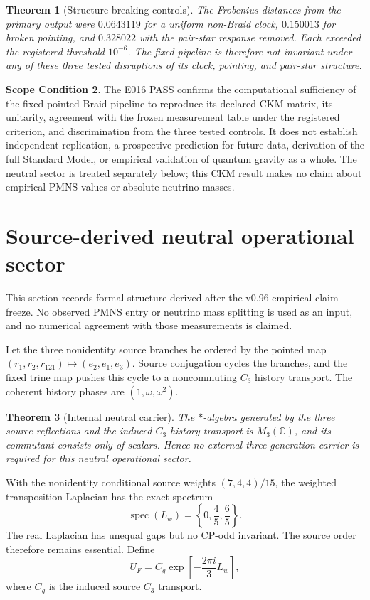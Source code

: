 \documentclass[11pt]{article}
\newtheorem{theorem}{Theorem}[section]
\theoremstyle{definition}
\newtheorem{scope}[theorem]{Scope Condition}
\theoremstyle{remark}
\begin{document}
\begin{theorem}[Structure-breaking controls]
The Frobenius distances from the primary output were $0.0643119$ for a uniform non-Braid clock, $0.150013$ for broken pointing, and $0.328022$ with the pair-star response removed. Each exceeded the registered threshold $10^{-6}$. The fixed pipeline is therefore not invariant under any of these three tested disruptions of its clock, pointing, and pair-star structure.
\end{theorem}

\begin{scope}
The E016 PASS confirms the computational sufficiency of the fixed pointed-Braid pipeline to reproduce its declared CKM matrix, its unitarity, agreement with the frozen measurement table under the registered criterion, and discrimination from the three tested controls. It does not establish independent replication, a prospective prediction for future data, derivation of the full Standard Model, or empirical validation of quantum gravity as a whole. The neutral sector is treated separately below; this CKM result makes no claim about empirical PMNS values or absolute neutrino masses.
\end{scope}

\section{Source-derived neutral operational sector}

This section records formal structure derived after the v0.96 empirical claim
freeze. No observed PMNS entry or neutrino mass splitting is used as an input,
and no numerical agreement with those measurements is claimed.

Let the three nonidentity source branches be ordered by the pointed map
$(r_1,r_2,r_{121})\mapsto(e_2,e_1,e_3)$. Source conjugation cycles the branches,
and the fixed trine map pushes this cycle to a noncommuting $C_3$ history
transport. The coherent history phases are $(1,\omega,\omega^2)$.

\begin{theorem}[Internal neutral carrier]
The $*$-algebra generated by the three source reflections and the induced
$C_3$ history transport is $M_3(\mathbb C)$, and its commutant consists only
of scalars. Hence no external three-generation carrier is required for this
neutral operational sector.
\end{theorem}

With the nonidentity conditional source weights
$(7,4,4)/15$, the weighted transposition Laplacian has the exact spectrum
\begin{equation}
\operatorname{spec}(L_w)=\left\{0,\frac45,\frac65\right\}.
\label{eq:neutral-laplacian}
\end{equation}
The real Laplacian has unequal gaps but no CP-odd invariant. The source order
therefore remains essential. Define
\begin{equation}
U_F=C_g\exp\!\left[-\frac{2\pi i}{3}L_w\right],
\label{eq:neutral-floquet}
\end{equation}
where $C_g$ is the induced source $C_3$ transport.
\end{document}
